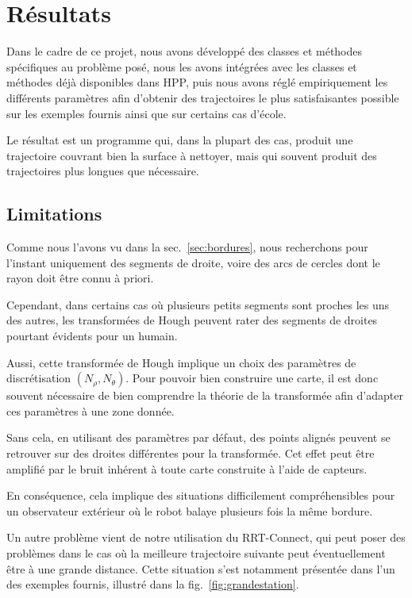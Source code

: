 \documentclass[french,A4paper,]{book}
\begin{document}
\section{Résultats}\label{sec:lemonres}

Dans le cadre de ce projet, nous avons développé des classes et méthodes
spécifiques au problème posé, nous les avons intégrées avec les classes
et méthodes déjà disponibles dans HPP, puis nous avons réglé
empiriquement les différents paramètres afin d'obtenir des trajectoires
le plus satisfaisantes possible sur les exemples fournis ainsi que sur
certains cas d'école.

Le résultat est un programme qui, dans la plupart des cas, produit une
trajectoire couvrant bien la surface à nettoyer, mais qui souvent
produit des trajectoires plus longues que nécessaire.

\subsection{Limitations}\label{limitations}

Comme nous l'avons vu dans la sec.~\ref{sec:bordures}, nous recherchons
pour l'instant uniquement des segments de droite, voire des arcs de
cercles dont le rayon doit être connu à priori.

Cependant, dans certains cas où plusieurs petits segments sont proches
les uns des autres, les transformées de Hough peuvent rater des segments
de droites pourtant évidents pour un humain.

Aussi, cette transformée de Hough implique un choix des paramètres de
discrétisation \((N_\rho, N_\theta)\). Pour pouvoir bien construire une
carte, il est donc souvent nécessaire de bien comprendre la théorie de
la transformée afin d'adapter ces paramètres à une zone donnée.

Sans cela, en utilisant des paramètres par défaut, des points alignés
peuvent se retrouver sur des droites différentes pour la transformée.
Cet effet peut être amplifié par le bruit inhérent à toute carte
construite à l'aide de capteurs.

En conséquence, cela implique des situations difficilement
compréhensibles pour un observateur extérieur où le robot balaye
plusieurs fois la même bordure.

Un autre problème vient de notre utilisation du RRT-Connect, qui peut
poser des problèmes dans le cas où la meilleure trajectoire suivante
peut éventuellement être à une grande distance. Cette situation s'est
notamment présentée dans l'un des exemples fournis, illustré dans la
fig.~\ref{fig:grandestation}.
\end{document}
